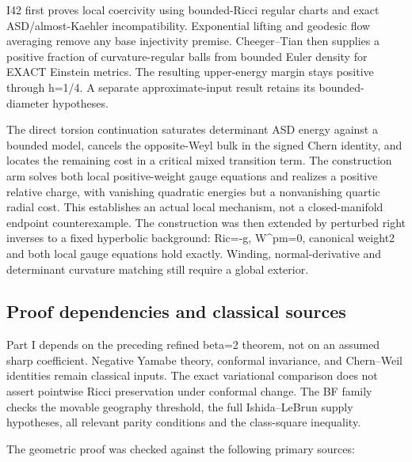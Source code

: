 \documentclass[
  10pt,
]{article}
\begin{document}
I42 first proves local coercivity using bounded-Ricci regular charts and
exact ASD/almost-Kaehler incompatibility. Exponential lifting and
geodesic flow averaging remove any base injectivity premise.
Cheeger--Tian then supplies a positive fraction of curvature-regular
balls from bounded Euler density for EXACT Einstein metrics. The
resulting upper-energy margin stays positive through h=1/4. A separate
approximate-input result retains its bounded-diameter hypotheses.

The direct torsion continuation saturates determinant ASD energy against
a bounded model, cancels the opposite-Weyl bulk in the signed Chern
identity, and locates the remaining cost in a critical mixed transition
term. The construction arm solves both local positive-weight gauge
equations and realizes a positive relative charge, with vanishing
quadratic energies but a nonvanishing quartic radial cost. This
establishes an actual local mechanism, not a closed-manifold endpoint
counterexample. The construction was then extended by perturbed right
inverses to a fixed hyperbolic background: Ric=-g, W\^{}pm=0, canonical
weight2 and both local gauge equations hold exactly. Winding,
normal-derivative and determinant curvature matching still require a
global exterior.

\hypertarget{proof-dependencies-and-classical-sources}{%
\subsection{Proof dependencies and classical
sources}\label{proof-dependencies-and-classical-sources}}

Part I depends on the preceding refined beta=2 theorem, not on an
assumed sharp coefficient. Negative Yamabe theory, conformal invariance,
and Chern--Weil identities remain classical inputs. The exact
variational comparison does not assert pointwise Ricci preservation
under conformal change. The BF family checks the movable geography
threshold, the full Ishida--LeBrun supply hypotheses, all relevant
parity conditions and the class-square inequality.

The geometric proof was checked against the following primary sources:
\end{document}
